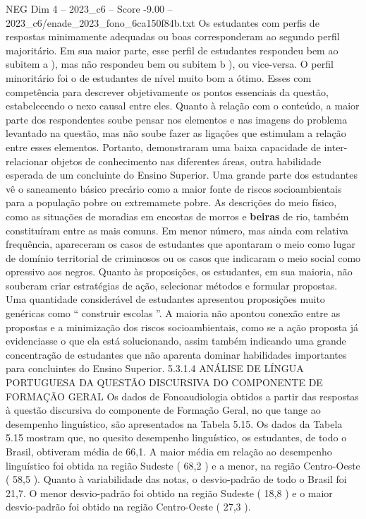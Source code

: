 \begin{textsample}{NEG Dim 4 – 2023\_c6 – Score -9.00 – 2023\_c6/enade\_2023\_fono\_6ca150f84b.txt}
Os estudantes com perfis de respostas minimamente adequadas ou boas corresponderam ao segundo perfil majoritário.
Em sua maior parte, esse perfil de estudantes respondeu bem ao subitem a ), mas não respondeu bem ou subitem b ), ou vice-versa.
O perfil minoritário foi o de estudantes de nível muito bom a ótimo.
Esses com competência para descrever objetivamente os pontos essenciais da questão, estabelecendo o nexo causal entre eles.
Quanto à relação com o conteúdo, a maior parte dos respondentes soube pensar nos elementos e nas imagens do problema levantado na questão, mas não soube fazer as ligações que estimulam a relação entre esses elementos.
Portanto, demonstraram uma baixa capacidade de inter-relacionar objetos de conhecimento nas diferentes áreas, outra habilidade esperada de um concluinte do Ensino Superior.
Uma grande parte dos estudantes vê o saneamento básico precário como a maior fonte de riscos socioambientais para a população pobre ou extremamete pobre.
As descrições do meio físico, como as situações de moradias em encostas de morros e \textbf{beiras} de rio, também constituíram entre as mais comuns.
Em menor número, mas ainda com relativa frequência, apareceram os casos de estudantes que apontaram o meio como lugar de domínio territorial de criminosos ou os casos que indicaram o meio social como opressivo aos negros.
Quanto às proposições, os estudantes, em sua maioria, não souberam criar estratégias de ação, selecionar métodos e formular propostas.
Uma quantidade considerável de estudantes apresentou proposições muito genéricas como “ construir escolas ”.
A maioria não apontou conexão entre as propostas e a minimização dos riscos socioambientais, como se a ação proposta já evidenciasse o que ela está solucionando, assim também indicando uma grande concentração de estudantes que não aparenta dominar habilidades importantes para concluintes do Ensino Superior. 5.3.1.4 ANÁLISE DE LÍNGUA PORTUGUESA DA QUESTÃO DISCURSIVA DO COMPONENTE DE FORMAÇÃO GERAL Os dados de Fonoaudiologia obtidos a partir das respostas à questão discursiva do componente de Formação Geral, no que tange ao desempenho linguístico, são apresentados na Tabela 5.15.
Os dados da Tabela 5.15 mostram que, no quesito desempenho linguístico, os estudantes, de todo o Brasil, obtiveram média de 66,1.
A maior média em relação ao desempenho linguístico foi obtida na região Sudeste ( 68,2 ) e a menor, na região Centro-Oeste ( 58,5 ).
Quanto à variabilidade das notas, o desvio-padrão de todo o Brasil foi 21,7.
O menor desvio-padrão foi obtido na região Sudeste ( 18,8 ) e o maior desvio-padrão foi obtido na região Centro-Oeste ( 27,3 ).

\end{textsample}
